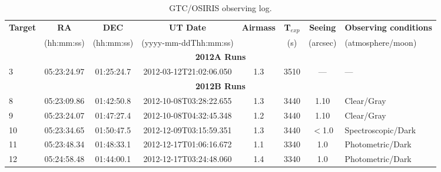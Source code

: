 \documentclass[12pt]{article}
\begin{document}
\begin{table} \tiny
\begin{center}
 \caption{GTC/OSIRIS observing log.}
 \label{tab:OSIRIS_log}
 \begin{threeparttable}
  	\setlength{\tabcolsep}{11pt}
	\begin{tabular}{lccccccl}
	\toprule
	{\bf Target} & {\bf RA}    & {\bf DEC}    & {\bf UT Date}        & {\bf Airmass} & {\bf T$_{exp}$} & {\bf Seeing} &  {\bf Observing conditions} \\
	             & (hh:mm:ss)  & (hh:mm:ss)   &(yyyy-mm-ddThh:mm:ss) &               & (s)             & (arcsec)     &  (atmosphere/moon)          \\
	\midrule
	\multicolumn{8}{c}{{\bf 2012A Runs}} \\
	3  & 05:23:24.97 & 01:25:24.7 & 2012-03-12T21:02:06.050 & 1.3  & 3510 & ---      & ---                 \\
	\multicolumn{8}{c}{{\bf 2012B Runs}} \\
	8  & 05:23:09.86 & 01:42:50.8 & 2012-10-08T03:28:22.655 & 1.3  & 3440 & 1.10     & Clear/Gray          \\
	9  & 05:23:24.07 & 01:47:27.4 & 2012-10-08T04:32:45.348 & 1.2  & 3440 & 1.10     & Clear/Gray          \\
	10 & 05:23:34.65 & 01:50:47.5 & 2012-12-09T03:15:59.351 & 1.3  & 3440 & $<$1.0   & Spectroscopic/Dark  \\
	11 & 05:23:48.34 & 01:48:33.1 & 2012-12-17T01:06:16.672 & 1.1  & 3340 & 1.0      & Photometric/Dark    \\
	12 & 05:24:58.48 & 01:44:00.1 & 2012-12-17T03:24:48.060 & 1.4  & 3340 & 1.0      & Photometric/Dark    \\

\end{tabular}
\end{threeparttable}
\end{center}
\end{table}
\end{document}

